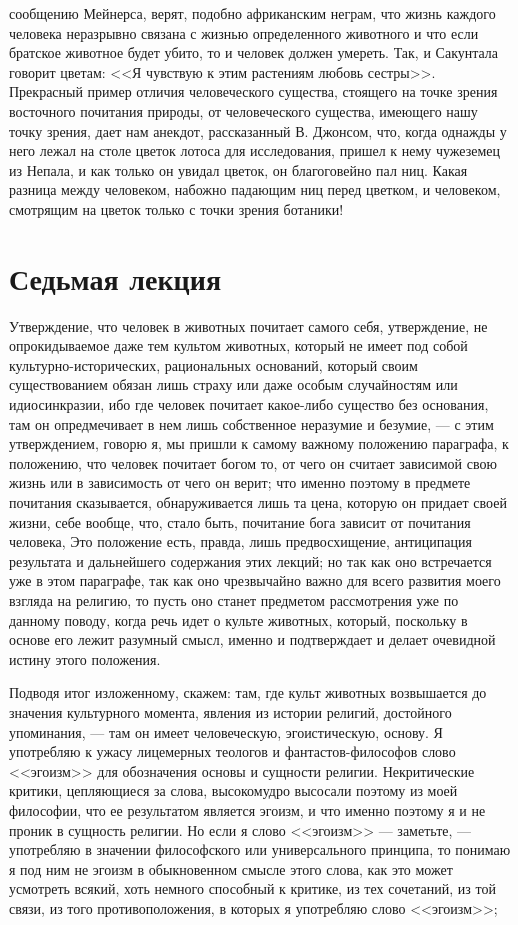 \documentclass[12pt]{article}
\begin{document}
сообщению Мейнерса, верят, подобно африканским неграм, что жизнь каждого человека неразрывно связана с жизнью определенного животного и что если братское животное будет убито, то и человек должен умереть. Так, и Сакунтала говорит цветам: <<Я чувствую к этим растениям любовь сестры>>. Прекрасный пример отличия человеческого существа, стоящего на точке зрения восточного почитания природы, от человеческого существа, имеющего нашу точку зрения, дает нам анекдот, рассказанный В. Джонсом, что, когда однажды у него лежал на столе цветок лотоса для исследования, пришел к нему чужеземец из Непала, и как только он увидал цветок, он благоговейно пал ниц. Какая разница между человеком, набожно падающим ниц перед цветком, и человеком, смотрящим на цветок только с точки зрения ботаники! 

\section*{Седьмая лекция}

Утверждение, что человек в животных почитает самого себя, утверждение, не опрокидываемое даже тем культом животных, который не имеет под собой культурно-исторических, рациональных оснований, который своим существованием обязан лишь страху или даже особым случайностям или идиосинкразии, ибо где человек почитает какое-либо существо без основания, там он опредмечивает в нем лишь собственное неразумие и безумие, --- с этим утверждением, говорю я, мы пришли к самому важному положению параграфа, к положению, что человек почитает богом то, от чего он считает зависимой свою жизнь или в зависимость от чего он верит; что именно поэтому в предмете почитания сказывается, обнаруживается лишь та цена, которую он придает своей жизни, себе вообще, что, стало быть, почитание бога зависит от почитания человека, Это положение есть, правда, лишь предвосхищение, антиципация результата и дальнейшего содержания этих лекций; но так как оно встречается уже в этом параграфе, так как оно чрезвычайно важно для всего развития моего взгляда на религию, то пусть оно станет предметом рассмотрения уже по данному поводу, когда речь идет о культе животных, который, поскольку в основе его лежит разумный смысл, именно и подтверждает и делает очевидной истину этого положения. 

Подводя итог изложенному, скажем: там, где культ животных возвышается до значения культурного момента, явления из истории религий, достойного упоминания, --- там он имеет человеческую, эгоистическую, основу. Я употребляю к ужасу лицемерных теологов и фантастов-философов слово <<эгоизм>> для обозначения основы и сущности религии. Некритические критики, цепляющиеся за слова, высокомудро высосали поэтому из моей философии, что ее результатом является эгоизм, и что именно поэтому я и не проник в сущность религии. Но если я слово <<эгоизм>>  --- заметьте, --- употребляю в значении философского или универсального принципа, то понимаю я под ним не эгоизм в обыкновенном смысле этого слова, как это может усмотреть всякий, хоть немного способный к критике, из тех сочетаний, из той связи, из того противоположения, в которых я употребляю слово <<эгоизм>>; 
\end{document}
